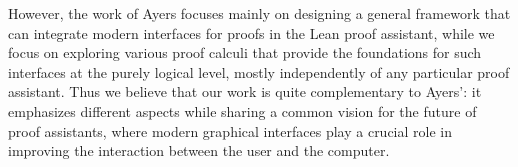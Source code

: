However, the work of Ayers focuses mainly on designing a general framework that
can integrate modern interfaces for proofs in the Lean proof assistant, while we
focus on exploring various proof calculi that provide the foundations for such
interfaces at the purely logical level, mostly independently of any particular
proof assistant. Thus we believe that our work is quite complementary to Ayers':
it emphasizes different aspects while sharing a common vision for the future of
proof assistants, where modern graphical interfaces play a crucial role in
improving the interaction between the user and the computer.